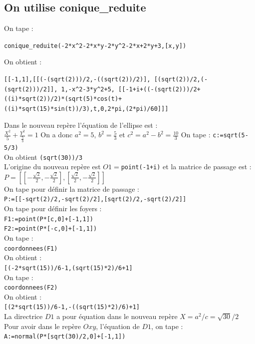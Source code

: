 \documentclass[a4paper,11pt]{book}
\begin{document}
\subsection{On utilise conique\_reduite}
On tape :\\
\begin{center}{\tt conique\_reduite(-2*x\verb|^|2-2*x*y-2*y\verb|^|2-2*x+2*y+3,[x,y])}\end{center}
On obtient :
\begin{center}{\tt [[-1,1],[[(-(sqrt(2)))/2,-((sqrt(2))/2)],
[(sqrt(2))/2,(-(sqrt(2)))/2]], 1,-x\verb|^|2-3*y\verb|^|2+5,
[[-1+i+((-(sqrt(2)))/2+((i)*sqrt(2))/2)*(sqrt(5)*cos(t)+\\
((i)*sqrt(15)*sin(t))/3),t,0,2*pi,(2*pi)/60]]]}\end{center}
Dans le nouveau rep\`ere l'\'equation de l'ellipse est :\\
$\frac{X^2}{5}+\frac{Y^2}{\frac{5}{3}}=1$
On a donc $a^2=5$, $b^2=\frac{5}{3}$ et $c^2=a^2-b^2=\frac{10}{3}$
On tape :
{\tt c:=sqrt(5-5/3)}\\
On obtient {\tt (sqrt(30))/3}\\
L'origine du nouveau rep\`ere est $O1=${\tt point(-1+i)} et la matrice de 
passage est :\\
$P=[[-\frac{\sqrt 2}{2},-\frac{\sqrt 2}{2}],[\frac{\sqrt 2}{2},-\frac{\sqrt 2}{2}]]$\\
On tape pour d\'efinir la matrice de passage  :\\
{\tt P:=[[-sqrt(2)/2,-sqrt(2)/2],[sqrt(2)/2,-sqrt(2)/2]]}\\
On tape pour d\'efinir les foyers :\\
{\tt F1:=point(P*[c,0]+[-1,1])}\\
{\tt F2:=point(P*[-c,0]+[-1,1])}\\
On tape :\\
{\tt coordonnees(F1)}\\
On obtient :\\
{\tt [(-2*sqrt(15))/6-1,(sqrt(15)*2)/6+1]}\\
On tape :\\
{\tt coordonnees(F2)}\\
On obtient :\\
{\tt [(2*sqrt(15))/6-1,-((sqrt(15)*2)/6)+1]}\\
La directrice $D1$ a pour \'equation dans le nouveau rep\`ere
$X=a^2/c=\sqrt{30}/2$\\
Pour avoir dans le rep\`ere $Oxy$, l'\'equation de $D1$, on tape :\\
{\tt A:=normal(P*[sqrt(30)/2,0]+[-1,1])}\\
\end{document}
